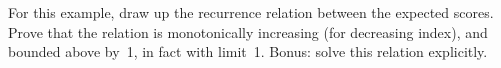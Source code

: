 For this example, draw up the recurrence relation
between the expected scores. Prove that the relation is
monotonically increasing (for decreasing index), and bounded above
by~1, in fact with limit~1. Bonus: solve this relation explicitly.
